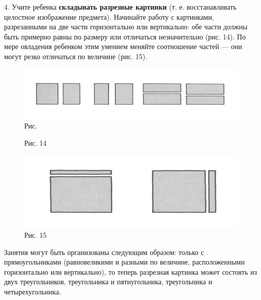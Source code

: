\documentclass{book}
\begin{document}
4. Учите ребенка \textbf{складывать разрезные картинки} (т. е.
восстанавливать целостное изображение предмета). Начинайте работу с
картинками, разрезанными на две части горизонтально или вертикально: обе
части должны быть примерно равны по размеру или отличаться незначительно
(рис. 14). По мере овладения ребенком этим умением меняйте соотношение
частей --- они могут резко отличаться по величине (рис. 15).

\begin{figure}
\centering
\includegraphics[width=\linewidth]{media/media/image14.png} Рис.
\caption*{Рис. 14}
\end{figure}

\begin{figure}
\centering
\includegraphics[width=\linewidth]{media/media/image15.png}
\caption*{Рис. 15}
\end{figure}

Занятия могут быть организованы следующим образом: только с
прямоугольниками (равновеликими и разными по величине, расположенными
горизонтально или вертикально), то теперь разрезная картинка может
состоять из двух треугольников, треугольника и пятиугольника,
треугольника и четырехугольника.
\end{document}
